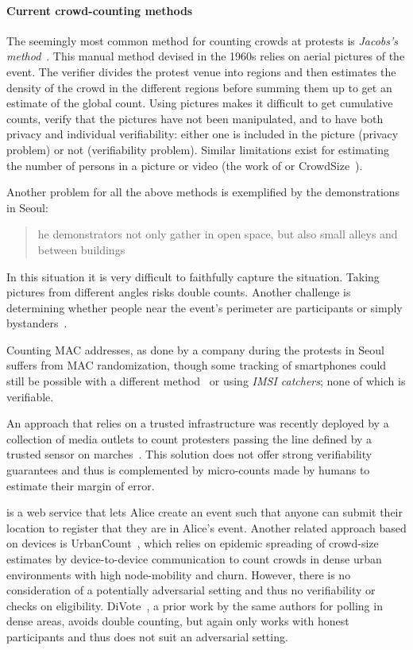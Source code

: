 \paragraph{Current crowd-counting methods}

The seemingly most common method for counting crowds at protests is \emph{Jacobs's method}~\cite{2016DemonstrationsInSeoul,BBCHowToCountProtestNumbers,HowWillWeKnowTrumpInauguralCrowdSize,TheXManMarch,TheCrowdNumbersGame}.
This manual method devised in the 1960s relies on aerial pictures of the event.
The verifier divides the protest venue into regions and then estimates the density of the crowd in the different regions before summing them up to get an estimate of the global count. Using pictures makes it difficult to get cumulative counts, verify that the pictures have not been manipulated, and to have both privacy and individual verifiability: either one is included in the picture (privacy problem) or not (verifiability problem). Similar limitations exist for estimating the number of persons in a picture or video (\eg the work of \cite{NNCrowdCounting} or  CrowdSize~\cite{CrowdSize}).

Another problem for all the above methods is exemplified by the demonstrations in Seoul:
\blockcquote{2016DemonstrationsInSeoul}{%
  he demonstrators not only gather in open space, but also small alleys and between buildings%
}.
In this situation it is very difficult to faithfully capture the situation.
Taking pictures from different angles risks double counts. Another challenge is 
determining whether people near the event's perimeter are participants or 
simply bystanders~\cite{HowToEstimateCrowdSize}.

Counting MAC addresses, as done by a company during the protests in Seoul~\cite{2016DemonstrationsInSeoul} suffers from MAC randomization, though some tracking of smartphones could still be possible with a different method~\cite{WhyMACRandomizationIsNotEnough} or using \emph{IMSI catchers}; none of which is verifiable.

An approach that relies on a trusted infrastructure was recently deployed by a collection of media outlets to count protesters passing the line defined by a trusted sensor on marches~\cite{LeMondeProtestingSolution}. 
This solution does not offer strong verifiability guarantees and thus is complemented by micro-counts made by humans to estimate their margin of error.

\Textcite{CrowdCount} is a web service that lets Alice create an event such 
that anyone can submit their location to register that they are in Alice's 
event.
Another related approach based on devices is UrbanCount~\cite{UrbanCount}, which relies on epidemic spreading of crowd-size estimates by device-to-device communication to count crowds in dense urban environments with high node-mobility and churn.
However, there is no consideration of a potentially adversarial setting and thus no verifiability or checks on eligibility.  DiVote~\cite{DiVote}, a prior work by the same authors for polling in dense areas, avoids double counting, but again only works with honest participants and thus does not suit an adversarial setting.

